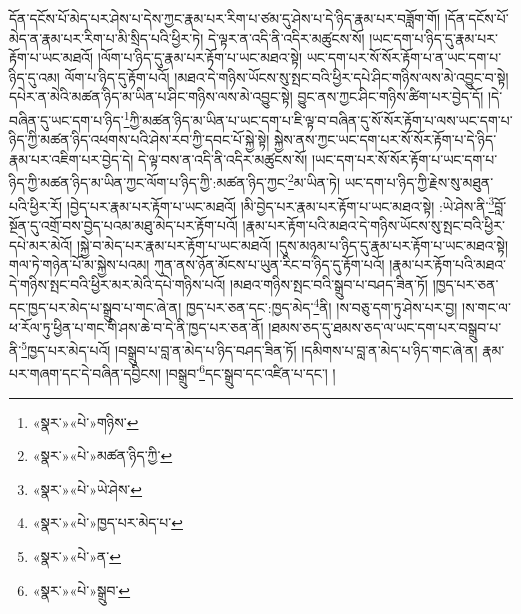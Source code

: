 དོན་དངོས་པོ་མེད་པར་ཤེས་པ་དེས་ཀྱང་རྣམ་པར་རིག་པ་ཙམ་དུ་ཤེས་པ་དེ་ཉིད་རྣམ་པར་བཟློག་གོ། །དོན་དངོས་པོ་མེད་ན་རྣམ་པར་རིག་པ་མི་སྲིད་པའི་ཕྱིར་ཏེ། དེ་ལྟར་ན་འདི་ནི་འདིར་མཚུངས་སོ། །ཡང་དག་པ་ཉིད་དུ་རྣམ་པར་རྟོག་པ་ཡང་མཐའོ། །ལོག་པ་ཉིད་དུ་རྣམ་པར་རྟོག་པ་ཡང་མཐའ་སྟེ། ཡང་དག་པར་སོ་སོར་རྟོག་པ་ན་ཡང་དག་པ་ཉིད་དུ་འམ། ལོག་པ་ཉིད་དུ་རྟོག་པའོ། །མཐའ་དེ་གཉིས་ཡོངས་སུ་སྤང་བའི་ཕྱིར་དཔེ་ཤིང་གཉིས་ལས་མེ་འབྱུང་བ་སྟེ། དཔེར་ན་མེའི་མཚན་ཉིད་མ་ཡིན་པ་ཤིང་གཉིས་ལས་མེ་འབྱུང་སྟེ། བྱུང་ནས་ཀྱང་ཤིང་གཉིས་ཚིག་པར་བྱེད་དོ། །དེ་བཞིན་དུ་ཡང་དག་པ་ཉིད་\footnote{«སྣར་»«པེ་»གཉིས་}ཀྱི་མཚན་ཉིད་མ་ཡིན་པ་ཡང་དག་པ་ཇི་ལྟ་བ་བཞིན་དུ་སོ་སོར་རྟོག་པ་ལས་ཡང་དག་པ་ཉིད་ཀྱི་མཚན་ཉིད་འཕགས་པའི་ཤེས་རབ་ཀྱི་དབང་པོ་སྐྱེ་སྟེ། སྐྱེས་ནས་ཀྱང་ཡང་དག་པར་སོ་སོར་རྟོག་པ་དེ་ཉིད་རྣམ་པར་འཇིག་པར་བྱེད་དེ། དེ་ལྟ་བས་ན་འདི་ནི་འདིར་མཚུངས་སོ། །ཡང་དག་པར་སོ་སོར་རྟོག་པ་ཡང་དག་པ་ཉིད་ཀྱི་མཚན་ཉིད་མ་ཡིན་ཀྱང་ལོག་པ་ཉིད་ཀྱི་:མཚན་ཉིད་ཀྱང་\footnote{«སྣར་»«པེ་»མཚན་ཉིད་ཀྱི་}མ་ཡིན་ཏེ། ཡང་དག་པ་ཉིད་ཀྱི་རྗེས་སུ་མཐུན་པའི་ཕྱིར་རོ། །བྱེད་པར་རྣམ་པར་རྟོག་པ་ཡང་མཐའོ། །མི་བྱེད་པར་རྣམ་པར་རྟོག་པ་ཡང་མཐའ་སྟེ། :ཡེ་ཤེས་ནི་\footnote{«སྣར་»«པེ་»ཡེ་ཤེས་}བློ་སྔོན་དུ་འགྲོ་བས་བྱེད་པའམ་མཐུ་མེད་པར་རྟོག་པའོ། །རྣམ་པར་རྟོག་པའི་མཐའ་དེ་གཉིས་ཡོངས་སུ་སྤང་བའི་ཕྱིར་དཔེ་མར་མེའོ། །སྐྱེ་བ་མེད་པར་རྣམ་པར་རྟོག་པ་ཡང་མཐའོ། །དུས་མཉམ་པ་ཉིད་དུ་རྣམ་པར་རྟོག་པ་ཡང་མཐའ་སྟེ། གལ་ཏེ་གཉེན་པོ་མ་སྐྱེས་པའམ། ཀུན་ནས་ཉོན་མོངས་པ་ཡུན་རིང་བ་ཉིད་དུ་རྟོག་པའོ། །རྣམ་པར་རྟོག་པའི་མཐའ་དེ་གཉིས་སྤང་བའི་ཕྱིར་མར་མེའི་དཔེ་གཉིས་པའོ། །མཐའ་གཉིས་སྤང་བའི་སྒྲུབ་པ་བཤད་ཟིན་ཏོ། །ཁྱད་པར་ཅན་དང་ཁྱད་པར་མེད་པ་སྒྲུབ་པ་གང་ཞེ་ན། ཁྱད་པར་ཅན་དང་:ཁྱད་མེད་\footnote{«སྣར་»«པེ་»ཁྱད་པར་མེད་པ་}ནི། །ས་བཅུ་དག་ཏུ་ཤེས་པར་བྱ། །ས་གང་ལ་ཕ་རོལ་ཏུ་ཕྱིན་པ་གང་གི་ཤས་ཆེ་བ་དེ་ནི་ཁྱད་པར་ཅན་ནོ། །ཐམས་ཅད་དུ་ཐམས་ཅད་ལ་ཡང་དག་པར་བསྒྲུབ་པ་ནི་\footnote{«སྣར་»«པེ་»ན་}ཁྱད་པར་མེད་པའོ། །བསྒྲུབ་པ་བླ་ན་མེད་པ་ཉིད་བཤད་ཟིན་ཏོ། །དམིགས་པ་བླ་ན་མེད་པ་ཉིད་གང་ཞེ་ན། རྣམ་པར་གཞག་དང་དེ་བཞིན་དབྱིངས། །བསྒྲུབ་\footnote{«སྣར་»«པེ་»སྒྲུབ་}དང་སྒྲུབ་དང་འཛིན་པ་དང་། །
